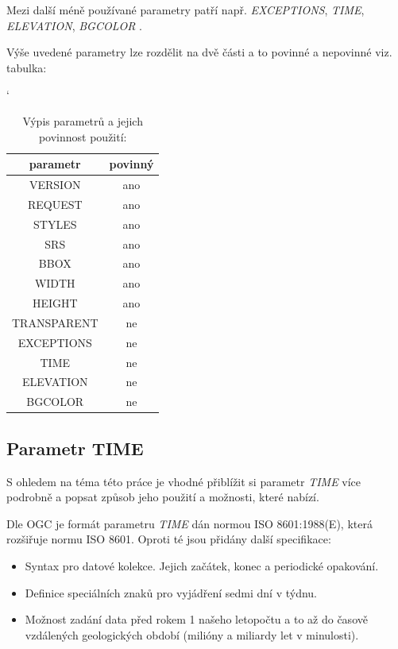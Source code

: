 Mezi další méně používané parametry patří např. \textit{EXCEPTIONS}, \textit{TIME}, \textit{ELEVATION}, \textit{BGCOLOR} \cite{oqc_wms}.

Výše uvedené parametry lze rozdělit na dvě části a to povinné a nepovinné viz. tabulka:

\bigskip
\begin{table}[h!]
	\catcode`
	\centering
	\begin{tabular}{|c|c|}
		\hline
		parametr & povinný \\ \hline
		\hline
		VERSION & ano \\ \hline
		REQUEST & ano \\ \hline
		STYLES & ano \\ \hline
		SRS & ano \\ \hline
		BBOX & ano \\ \hline
		WIDTH & ano \\ \hline
		HEIGHT & ano \\ \hline
		TRANSPARENT & ne \\ \hline
		EXCEPTIONS & ne \\ \hline
		TIME & ne \\ \hline
		ELEVATION & ne \\ \hline
		BGCOLOR & ne \\ \hline
\end{tabular}
	\caption{Výpis parametrů a jejich povinnost použití: \cite{oqc_wms}}
	\label{tab:WPS_ExecuteRequest}
\end{table}

\subsection{Parametr TIME}
S ohledem na téma této práce je vhodné přiblížit si parametr \textit{TIME} více podrobně a popsat způsob jeho použití a možnosti, které nabízí.

Dle OGC je formát parametru \textit{TIME} dán normou ISO 8601:1988(E), která rozšiřuje normu ISO 8601. Oproti té jsou přidány další specifikace\cite{oqc_wms}:
\begin{itemize}
	\item Syntax pro datové kolekce. Jejich začátek, konec a periodické opakování.
	\item Definice speciálních znaků pro vyjádření sedmi dní v týdnu.  
	\item Možnost zadání data před rokem 1 našeho letopočtu a to až do časově vzdálených geologických období (milióny a miliardy let v minulosti).
\end{itemize}

